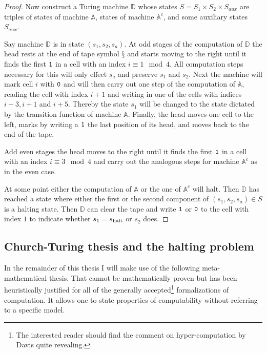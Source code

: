 \begin{proof}
  Now construct a Turing machine \(\mathbb{D}\) whose states \(S = S_1 \times
  S_2 \times S_{aux}\) are triples of states of machine \(\mathbb{A}\), states
  of machine \(\mathbb{A}^c\), and some auxiliary states \(S_{aux}\).

  Say machine \(\mathbb{D}\) is in state \((s_1, s_2, s_a)\). At odd stages of
  the computation of \(\mathbb{D}\) the head rests at the end of tape symbol
  \(§\) and starts moving to the right until it finds the first \(\mathtt{1}\) in a
  cell with an index \(i \equiv 1 \mod 4\). All computation steps necessary for
  this will only effect \(s_a\) and preserve \(s_1\) and \(s_2\).
  Next the machine will mark cell \(i\) with \(\mathtt{0}\) and will then carry out
  one step of the computation of \(\mathbb{A}\), reading the cell with index \(i
  + 1\) and writing in one of the cells with indices \(i - 3, i + 1\) and \(i +
  5\). Thereby the state \(s_1\) will be changed to the state dictated by the
  transition function of machine \(\mathbb{A}\).
  Finally, the head moves one cell to the left, marks by writing a \(\mathtt{1}\) the
  last position of its head, and moves back to the end of the tape.

  Add even stages the head moves to the right until it finds the first \(\mathtt{1}\)
  in a cell with an index \(i \equiv 3 \mod 4\) and carry out the analogous
  steps for machine \(\mathbb{A}^c\) as in the even case.

  At some point either the computation of \(\mathbb{A}\) or the one of
  \(\mathbb{A}^c\) will halt. Then \(\mathbb{D}\) has reached a state where
  either the first or the second component of \((s_1, s_2, s_a) ∈ S\) is a
  halting state. Then \(\mathbb{D}\) can clear the tape and write \(\mathtt{1}\) or
  \(\mathtt{0}\) to the cell with index \(1\) to indicate whether \(s_1 = s_{\text{halt}}\) or
  \(s_2\) does.
\end{proof}

\subsection{Church-Turing thesis and the halting problem}


In the remainder of this thesis I will make use of the following
meta-mathematical thesis. That cannot be mathematically proven but has been
heuristically justified for all of the generally accepted\footnote{The
interested reader should find the comment \cite{Davis2006} on hyper-computation
by Davis quite revealing.} formalizations of computation. It allows one to state
properties of computability without referring to a specific model.

